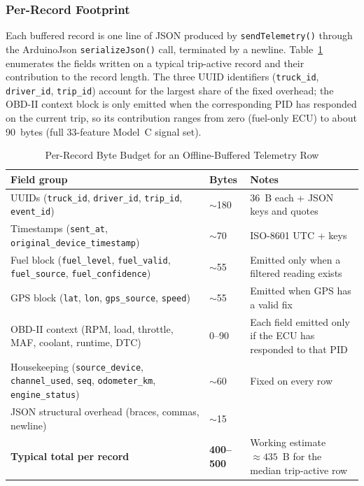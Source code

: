 \subsubsection{Per-Record Footprint}
\label{sec:offline_record_footprint}

Each buffered record is one line of JSON produced by \texttt{sendTelemetry()} through the ArduinoJson \texttt{serializeJson()} call, terminated by a newline. Table~\ref{tab:offline_record_size} enumerates the fields written on a typical trip-active record and their contribution to the record length. The three UUID identifiers (\texttt{truck\_id}, \texttt{driver\_id}, \texttt{trip\_id}) account for the largest share of the fixed overhead; the OBD-II context block is only emitted when the corresponding PID has responded on the current trip, so its contribution ranges from zero (fuel-only ECU) to about 90~bytes (full 33-feature Model~C signal set).

\begin{table}[!htbp]
\centering
\caption{Per-Record Byte Budget for an Offline-Buffered Telemetry Row}
\label{tab:offline_record_size}
\small
\begin{tabular}{|p{}|p{}|p{}|}
\hline
\textbf{Field group} & \textbf{Bytes} & \textbf{Notes} \\
\hline
UUIDs (\texttt{truck\_id}, \texttt{driver\_id}, \texttt{trip\_id}, \texttt{event\_id}) & $\sim$180 & 36~B each + JSON keys and quotes \\
\hline
Timestamps (\texttt{sent\_at}, \texttt{original\_device\_timestamp}) & $\sim$70 & ISO-8601 UTC + keys \\
\hline
Fuel block (\texttt{fuel\_level}, \texttt{fuel\_valid}, \texttt{fuel\_source}, \texttt{fuel\_confidence}) & $\sim$55 & Emitted only when a filtered reading exists \\
\hline
GPS block (\texttt{lat}, \texttt{lon}, \texttt{gps\_source}, \texttt{speed}) & $\sim$55 & Emitted when GPS has a valid fix \\
\hline
OBD-II context (RPM, load, throttle, MAF, coolant, runtime, DTC) & 0--90 & Each field emitted only if the ECU has responded to that PID \\
\hline
Housekeeping (\texttt{source\_device}, \texttt{channel\_used}, \texttt{seq}, \texttt{odometer\_km}, \texttt{engine\_status}) & $\sim$60 & Fixed on every row \\
\hline
JSON structural overhead (braces, commas, newline) & $\sim$15 & \\
\hline
\textbf{Typical total per record} & \textbf{400--500} & Working estimate $\approx 435$~B for the median trip-active row \\
\hline
\end{tabular}
\end{table}

